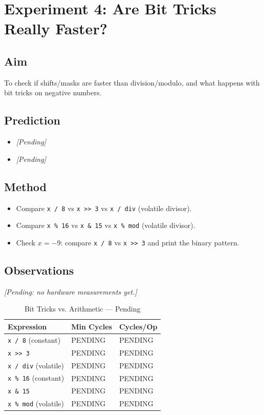\section{Experiment 4: Are Bit Tricks Really Faster?}

\subsection{Aim}
To check if shifts/masks are faster than division/modulo, and what happens with bit tricks on negative numbers.

\subsection{Prediction}
\begin{itemize}[noitemsep]
    \item \textit{[Pending]}
    \item \textit{[Pending]}
\end{itemize}

\subsection{Method}
\begin{itemize}[noitemsep]
    \item Compare \texttt{x / 8} vs \texttt{x >> 3} vs \texttt{x / div} (volatile divisor).
    \item Compare \texttt{x \% 16} vs \texttt{x \& 15} vs \texttt{x \% mod} (volatile divisor).
    \item Check $x = -9$: compare \texttt{x / 8} vs \texttt{x >> 3} and print the binary pattern.
\end{itemize}

\subsection{Observations}
\textit{[Pending: no hardware measurements yet.]}

\begin{table}[htbp]
\centering
\caption{Bit Tricks vs. Arithmetic --- Pending}
\label{tab:exp4_obs}
\small
\begin{tabularx}{\textwidth}{l X X}
\toprule
\textbf{Expression} & \textbf{Min Cycles} & \textbf{Cycles/Op} \\
\midrule
\texttt{x / 8} (constant) & PENDING & PENDING \\
\texttt{x >> 3} & PENDING & PENDING \\
\texttt{x / div} (volatile) & PENDING & PENDING \\
\texttt{x \% 16} (constant) & PENDING & PENDING \\
\texttt{x \& 15} & PENDING & PENDING \\
\texttt{x \% mod} (volatile) & PENDING & PENDING \\
\bottomrule
\end{tabularx}
\end{table}


